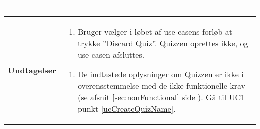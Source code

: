 \begin{center}
\begin{longtable}{|p{4.6cm}|p{9.4cm}|}
\begin{enumerate}
			\end{enumerate}\\\hline
		\textbf{Undtagelser}
			&\begin{enumerate} [label=\ref{ucCreateQuizDone}.a]
				\item Bruger vælger i løbet af use casens forløb at trykke ''Discard Quiz''.
				\subitem Quizzen oprettes ikke, og use casen afsluttes.
			\end{enumerate}
			\begin{enumerate} [label=\ref{ucCreateQuizDone}.b]
				\item De indtastede oplysninger om Quizzen er ikke i overensstemmelse med de ikke-funktionelle krav (se afsnit \ref{sec:nonFunctional} side \pageref{sec:nonFunctional} ).
				\subitem Gå til UC1 punkt \ref{ucCreateQuizName}.
			\end{enumerate}	
			\\\hline
	\end{longtable} 
\end{center}